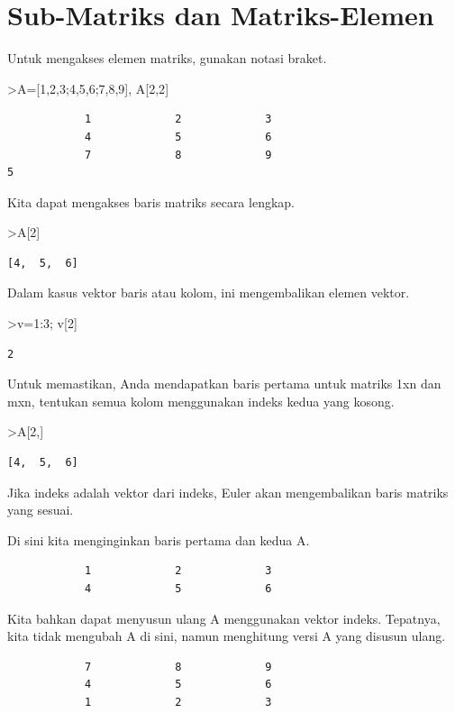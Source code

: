 \documentclass[
]{book}
\begin{document}
\chapter{Sub-Matriks dan Matriks-Elemen}\label{sub-matriks-dan-matriks-elemen}

Untuk mengakses elemen matriks, gunakan notasi braket.

\textgreater A={[}1,2,3;4,5,6;7,8,9{]}, A{[}2,2{]}

\begin{verbatim}
            1             2             3 
            4             5             6 
            7             8             9 
5
\end{verbatim}

Kita dapat mengakses baris matriks secara lengkap.

\textgreater A{[}2{]}

\begin{verbatim}
[4,  5,  6]
\end{verbatim}

Dalam kasus vektor baris atau kolom, ini mengembalikan elemen vektor.

\textgreater v=1:3; v{[}2{]}

\begin{verbatim}
2
\end{verbatim}

Untuk memastikan, Anda mendapatkan baris pertama untuk matriks 1xn dan mxn, tentukan semua kolom menggunakan indeks kedua yang kosong.

\textgreater A{[}2,{]}

\begin{verbatim}
[4,  5,  6]
\end{verbatim}

Jika indeks adalah vektor dari indeks, Euler akan mengembalikan baris matriks yang sesuai.

Di sini kita menginginkan baris pertama dan kedua A.

\begin{verbatim}
            1             2             3 
            4             5             6 
\end{verbatim}

Kita bahkan dapat menyusun ulang A menggunakan vektor indeks. Tepatnya, kita tidak mengubah A di sini, namun menghitung versi A yang disusun ulang.

\begin{verbatim}
            7             8             9 
            4             5             6 
            1             2             3 
\end{verbatim}
\end{document}
